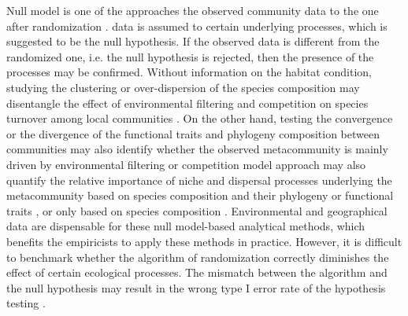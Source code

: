Null model is one of the approaches \DIFdelbegin {}\DIFdelend \DIFaddbegin {}\DIFaddend the observed community data to the one after randomization \citep{gotelli2006null, gotelli2012statistical}. \DIFdelbegin {}\DIFdelend \DIFaddbegin {}\DIFaddend data is assumed to \DIFdelbegin {}\DIFdelend \DIFaddbegin {}\DIFaddend certain underlying processes, which is suggested to be the null hypothesis. If the observed data is \DIFdelbegin {}\DIFdelend \DIFaddbegin {}\DIFaddend different from the randomized one, i.e. the null hypothesis is rejected, then the presence of the processes may be confirmed. Without \DIFdelbegin {}\DIFdelend information on the habitat condition, studying the clustering or over-dispersion of the species composition may disentangle the effect of environmental filtering and competition on species turnover among local communities \citep{diamond1975island, connor1979assembly, chase2011disentangling}. On the other hand, testing the convergence or the divergence of the functional traits and phylogeny composition between communities may also identify whether the observed metacommunity is mainly driven by environmental filtering or competition \DIFdelbegin {}\DIFdelend \DIFaddbegin {}\DIFaddend model approach may also quantify the relative importance of niche and dispersal processes underlying the metacommunity based on species composition and their phylogeny or functional traits \citep{stegen2013quantifying, ford2020functional}, or only based on species composition \citep{gibert2019per, vilmi2021dispersal}. Environmental and geographical data are dispensable for these null model-based analytical methods, which benefits the empiricists to apply these methods in practice. However, it is difficult to benchmark whether the algorithm of randomization correctly diminishes the effect of certain ecological processes. The mismatch between the algorithm and the null hypothesis may result in the wrong type I error rate of the hypothesis testing \citep{molina2020difficulties}.   

